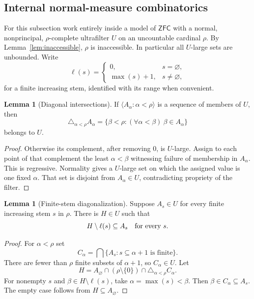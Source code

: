 \documentclass[11pt,letterpaper]{article}
\theoremstyle{definition}
\newtheorem{lemma}[definition]{Lemma}
\newcommand{\ZFC}{\mathsf{ZFC}}
\newcommand{\seq}[1]{\langle #1\rangle}
\begin{document}
\subsection{Internal normal-measure combinatorics}

For this subsection work entirely inside a model of $\ZFC$ with a normal, nonprincipal, $\rho$-complete ultrafilter $U$ on an uncountable cardinal $\rho$. By Lemma~\ref{lem:inaccessible}, $\rho$ is inaccessible. In particular all $U$-large sets are unbounded. Write
\[
 \ell(s)=\begin{cases}0,&s=\varnothing,\\ \max(s)+1,&s\ne\varnothing,
 \end{cases}
\]
for a finite increasing stem, identified with its range when convenient.

\begin{lemma}[Diagonal intersections]\label{lem:diagonal}
If $\seq{A_\alpha:\alpha<\rho}$ is a sequence of members of $U$, then
\[
 \triangle_{\alpha<\rho}A_\alpha
       =\{\beta<\rho:(\forall\alpha<\beta)\ \beta\in A_\alpha\}
\]
belongs to $U$.
\end{lemma}

\begin{proof}
Otherwise its complement, after removing $0$, is $U$-large. Assign to each point of that complement the least $\alpha<\beta$ witnessing failure of membership in $A_\alpha$. This is regressive. Normality gives a $U$-large set on which the assigned value is one fixed $\alpha$. That set is disjoint from $A_\alpha\in U$, contradicting propriety of the filter.
\end{proof}

\begin{lemma}[Finite-stem diagonalization]\label{lem:stemdiag}
Suppose $A_s\in U$ for every finite increasing stem $s$ in $\rho$. There is $H\in U$ such that
\[
                         H\setminus\ell(s)\subseteq A_s
                    \quad\hbox{for every }s.
\]
\end{lemma}

\begin{proof}
For $\alpha<\rho$ set
\[
 C_\alpha=\bigcap\{A_s:s\subseteq\alpha+1\text{ is finite}\}.
\]
There are fewer than $\rho$ finite subsets of $\alpha+1$, so $C_\alpha\in U$. Let
\[
 H=A_\varnothing\cap(\rho\setminus\{0\})
        \cap\triangle_{\alpha<\rho}C_\alpha.
\]
For nonempty $s$ and $\beta\in H\setminus\ell(s)$, take $\alpha=\max(s)<\beta$. Then $\beta\in C_\alpha\subseteq A_s$. The empty case follows from $H\subseteq A_\varnothing$.
\end{proof}
\end{document}
